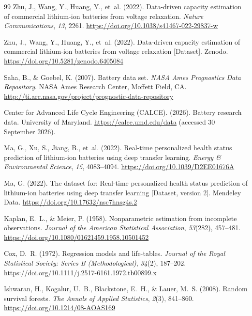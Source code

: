 \documentclass[preprint,12pt]{elsarticle}
\begin{document}
\begin{thebibliography}{99}
Zhu, J., Wang, Y., Huang, Y., et~al. (2022). Data-driven capacity estimation of commercial lithium-ion batteries from voltage relaxation. \textit{Nature Communications}, \textit{13}, 2261. \url{https://doi.org/10.1038/s41467-022-29837-w}

Zhu, J., Wang, Y., Huang, Y., et~al. (2022). Data-driven capacity estimation of commercial lithium-ion batteries from voltage relaxation [Dataset]. Zenodo. \url{https://doi.org/10.5281/zenodo.6405084}

Saha, B., \& Goebel, K. (2007). Battery data set. \textit{NASA Ames Prognostics Data Repository}. NASA Ames Research Center, Moffett Field, CA. \url{http://ti.arc.nasa.gov/project/prognostic-data-repository}

Center for Advanced Life Cycle Engineering (CALCE). (2026). Battery research data. University of Maryland. \url{https://calce.umd.edu/data} (accessed 30 September 2026).

Ma, G., Xu, S., Jiang, B., et~al. (2022). Real-time personalized health status prediction of lithium-ion batteries using deep transfer learning. \textit{Energy \& Environmental Science}, \textit{15}, 4083--4094. \url{https://doi.org/10.1039/D2EE01676A}

Ma, G. (2022). The dataset for: Real-time personalized health status prediction of lithium-ion batteries using deep transfer learning [Dataset, version 2]. Mendeley Data. \url{https://doi.org/10.17632/nsc7hnsg4s.2}

Kaplan, E.~L., \& Meier, P. (1958). Nonparametric estimation from incomplete observations. \textit{Journal of the American Statistical Association}, \textit{53}(282), 457--481. \url{https://doi.org/10.1080/01621459.1958.10501452}

Cox, D.~R. (1972). Regression models and life-tables. \textit{Journal of the Royal Statistical Society: Series B (Methodological)}, \textit{34}(2), 187--202. \url{https://doi.org/10.1111/j.2517-6161.1972.tb00899.x}

Ishwaran, H., Kogalur, U.~B., Blackstone, E.~H., \& Lauer, M.~S. (2008). Random survival forests. \textit{The Annals of Applied Statistics}, \textit{2}(3), 841--860. \url{https://doi.org/10.1214/08-AOAS169}


\end{thebibliography}
\end{document}
